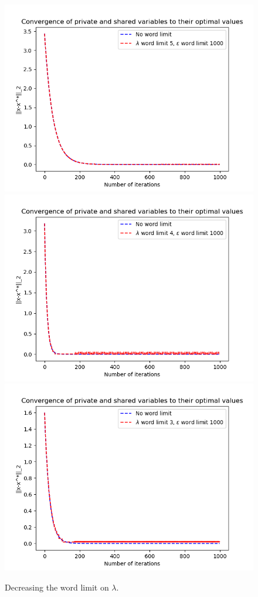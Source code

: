 \documentclass[12pt]{article}
\begin{document}
\begin{figure}[H]
	\centering
	\includegraphics[scale=0.5]{Problem4-Convergence2.png}
	\includegraphics[scale=0.5]{Problem4-Convergence3.png}
	\includegraphics[scale=0.5]{Problem4-Convergence4.png}
	\caption{Decreasing the word limit on $\lambda$.}
\end{figure}
\end{document}
